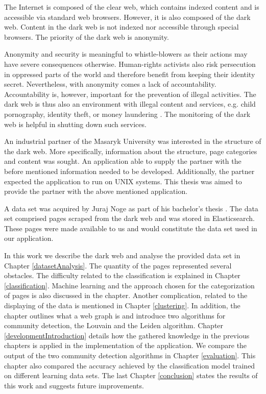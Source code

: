 \label{introduction}
The Internet is composed of the clear web, which contains indexed content and is accessible via standard web browsers. However, it is also composed of the dark web. Content in the dark web is not indexed nor accessible through special browsers. The priority of the dark web is anonymity.

Anonymity and security is meaningful to whistle-blowers as their actions may have severe consequences otherwise. Human-rights activists also risk persecution in oppressed parts of the world and therefore benefit from keeping their identity secret. Nevertheless, with anonymity comes a lack of accountability. Accountability is, however, important for the prevention of illegal activities. The dark web is thus also an environment with illegal content and services, e.g. child pornography, identity theft, or money laundering \cite{theDarkNet}. The monitoring of the dark web is helpful in shutting down such services.

An industrial partner of the Masaryk University was interested in the structure of the dark web. More specifically, information about the structure, page categories and content was sought. An application able to supply the partner with the before mentioned information needed to be developed. Additionally, the partner expected the application to run on UNIX systems. This thesis was aimed to provide the partner with the above mentioned application. 

A data set was acquired by Juraj Noge as part of his bachelor's thesis \cite{bcScraping}. The data set comprised pages scraped from the dark web and was stored in Elasticsearch. These pages were made available to us and would constitute the data set used in our application.

In this work we describe the dark web and analyse the provided data set in Chapter \ref{datasetAnalysis}. The quantity of the pages represented several obstacles. The difficulty related to the classification is explained in Chapter \ref{classification}. Machine learning and the approach chosen for the categorization of pages is also discussed in the chapter. Another complication, related to the displaying of the data is mentioned in Chapter \ref{clustering}. In addition, the chapter outlines what a web graph is and introduce two algorithms for community detection, the Louvain and the Leiden algorithm. Chapter \ref{developmentIntroduction} details how the gathered knowledge in the previous chapters is applied in the implementation of the application. We compare the output of the two community detection algorithms in Chapter \ref{evaluation}. This chapter also compared the accuracy achieved by the classification model trained on different learning data sets. The last Chapter \ref{conclusion} states the results of this work and suggests future improvements.

